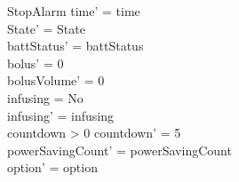 \begin{schema}{StopAlarm}
	time' = time\\ State' = State\\
	battStatus' = battStatus\\
	bolus' = 0\\
		\pagebreak
	bolusVolume' = 0\\
	infusing = No\\
	infusing' = infusing\\
	countdown > 0 \land countdown' = 5\\
	powerSavingCount' = powerSavingCount\\ option' = option\\
\end{schema}


